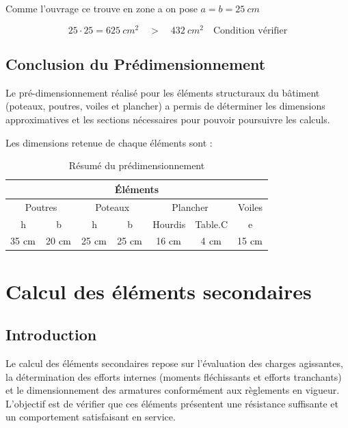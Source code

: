 \documentclass[12pt,a4paper]{report}
\newcommand{\RomanNum}[1] %
{\MakeUppercase{\romannumeral #1}}
\numberwithin{equation}{section}
\begin{document}
	\vspace{\baselineskip}
	
	Comme l'ouvrage ce trouve en zone \RomanNum{2}a on pose $a = b = 25 ~\unit{cm}$
	
	
	\[ 25 \cdot 25 = 625 ~\unit{cm^{2}} \quad > \quad 432 ~\unit{cm^{2}} \quad \text{Condition vérifier} \]

	
	\section{Conclusion du Prédimensionnement}
	
	Le pré-dimensionnement réalisé pour les éléments structuraux du bâtiment (poteaux, poutres, voiles et plancher) a permis de déterminer les dimensions approximatives et les sections nécessaires pour pouvoir poursuivre les calculs.
	
	
	Les dimensions retenue de chaque éléments sont :
	
	\begin{table}[H]
		\centering
		\caption{Résumé du prédimensionnement}
		\begin{tabular}{|c|c|c|c|c|c|c|}
			\hline
			\multicolumn{7}{|c|}{Éléments} \\ \hline
			\multicolumn{2}{|c|}{Poutres} & \multicolumn{2}{c|}{Poteaux} & \multicolumn{2}{c|}{Plancher} & Voiles \\ \hline
			h & b & h & b & Hourdis & Table.C & e \\ \hline
			35$\cml$ & 20$\cml$ & 25$\cml$ & 25$\cml$ & 16$\cml$ & 4$\cml$ & 15$\cml$ \\ \hline
		\end{tabular}
	\end{table}
	
	
	
	

	
	\chapter{Calcul des éléments secondaires}
	
	
	
	\section{Introduction}
	
	Le calcul des éléments secondaires repose sur l’évaluation des charges agissantes, la détermination des efforts internes (moments fléchissants et efforts tranchants) et le dimensionnement des armatures conformément aux règlements en vigueur. L’objectif est de vérifier que ces éléments présentent une résistance suffisante et un comportement satisfaisant en service.
	
\end{document}
